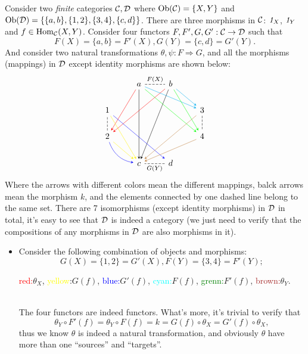 \documentclass{article}
\begin{document}
\begin{exm}
	Consider two \emph{finite} categories $\mathcal{C},\mathcal{D}$ where $\mathrm{Ob}(\mathcal{C})=\{X,Y\}$ and $\mathrm{Ob}(\mathcal{D})=\{\{a,b\},\{1,2\},\{3,4\},\{c,d\}\}$. There are three morphisms in $\mathcal{C}$: $\mathit{1}_X$, $\mathit{1}_Y$ and $f\in\mathrm{Hom}_{\mathcal{C}}(X,Y)$. Consider four functors $F,F',G,G':\mathcal{C}\to\mathcal{D}$ such that
	\[F(X)=\{a,b\}=F'(X),G(Y)=\{c,d\}=G'(Y).\]
	And consider two natural transformations $\theta,\psi:F\Rightarrow G$, and all the morphisms (mappings) in $\mathcal{D}$ except identity morphisms are shown below:
	\[\begin{tikzcd}
	& a \arrow[r,no head,dashed,"F(X)"] \arrow[->,>=stealth,ldd,color=red] \arrow[->,>=stealth,rrdd,color=green] \arrow[->,>=stealth,rrd,color=cyan] \arrow[->,>=stealth,ddd]
	& b \arrow[->,>=stealth,lldd,color=red] \arrow[->,>=stealth,rd,color=cyan] \arrow[->,>=stealth,rdd,color=green] \arrow[->,>=stealth,lddd] & \\
	  1 \arrow[->,>=stealth,rdd,color=yellow] \arrow[->,>=stealth,rrdd,color=blue] && 
	& 3 \arrow[d,no head,dashed] \arrow[->,>=stealth,lldd,color=brown]\\
	  2 \arrow[u,no head,dashed] \arrow[->,>=stealth,rd,color=yellow] \arrow[->,>=stealth,rd,color=blue,bend right] &&
	& 4 \arrow[->,>=stealth,lld,color=brown]\\
	& c 
	& d \arrow[l,no head,dashed,"G(Y)"] &         
	\end{tikzcd}\]
	Where the arrows with different colors mean the different mappings, balck arrows mean the morphism $k$, and the elements connected by one dashed line belong to the same set. There are 7 isomorphisms (except identity morphisms) in $\mathcal{D}$ in total, it's easy to see that $\mathcal{D}$ is indeed a category (we just need to verify that the compositions of any morphisms in $\mathcal{D}$ are also morphisms in it).
	
	\begin{itemize}
		\item Consider the following combination of objects and morphisms:
			\[G(X)=\{1,2\}=G'(X),F(Y)=\{3,4\}=F'(Y);\]
			\centerline{\textcolor{red}{red:}$\theta_X$, \textcolor{yellow}{yellow}:$G(f)$, \textcolor{blue}{blue:}$G'(f)$, \textcolor{cyan}{cyan:}$F(f)$, \textcolor{green}{grenn:}$F'(f)$, \textcolor{brown}{brown:}$\theta_Y$.}\\
		The four functors are indeed functors. What's more, it's trivial to verify that
		\[\theta_Y\circ F'(f)=\theta_Y\circ F(f)=k=G(f)\circ\theta_X=G'(f)\circ\theta_X,\]
		thus we know $\theta$ is indeed a natural transformation, and obviously $\theta$ have more than one ``sources'' and ``targets''.
		

\end{itemize}
\end{exm}
\end{document}

